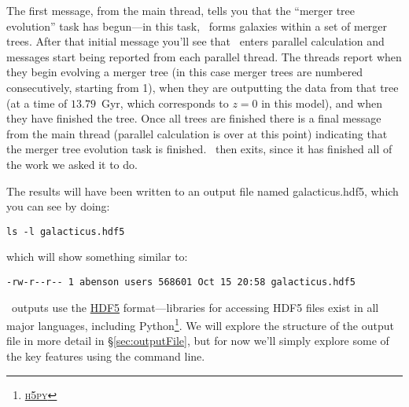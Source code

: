 The first message, from the main thread, tells you that the ``merger tree evolution'' task has begun---in this task, \glc\ forms galaxies within a set of merger trees. After that initial message you'll see that \glc\ enters parallel calculation and messages start being reported from each parallel thread. The threads report when they begin evolving a merger tree (in this case merger trees are numbered consecutively, starting from 1), when they are outputting the data from that tree (at a time of $13.79$~Gyr, which corresponds to $z=0$ in this model), and when they have finished the tree. Once all trees are finished there is a final message from the main thread (parallel calculation is over at this point) indicating that the merger tree evolution task is finished. \glc\ then exits, since it has finished all of the work we asked it to do.

The results will have been written to an output file named {\normalfont \ttfamily galacticus.hdf5}, which you can see by doing:
\begin{verbatim}
ls -l galacticus.hdf5
\end{verbatim}
which will show something similar to:
\begin{verbatim}
-rw-r--r-- 1 abenson users 568601 Oct 15 20:58 galacticus.hdf5
\end{verbatim}
\glc\ outputs use the \href{https://www.hdfgroup.org/solutions/hdf5/}{HDF5} format---libraries for accessing HDF5 files exist in all major languages, including Python\footnote{\href{https://www.h5py.org/}{{\normalfont \scshape h5py}}}. We will explore the structure of the output file in more detail in \S\ref{sec:outputFile}, but for now we'll simply explore some of the key features using the command line.

